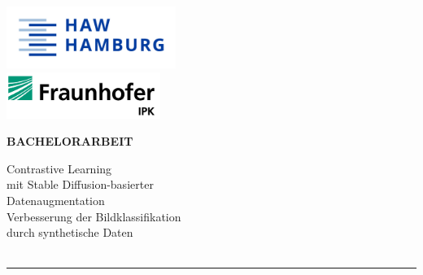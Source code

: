 \begin{titlepage}
  \color{haw}
  \raggedright
  \hfill\includegraphics[width=5.5cm]{logo_haw.jpg}\\
  \vspace{0.5cm}
  \hspace{\fill}\advance{}\includegraphics[width=5.0cm]{logo_fraunhofer-ipk.png}\\

  \vspace{5cm}

  \setmainfont{Open Sans}
  \small
  \textbf{BACHELORARBEIT}

  \vspace{8mm}

  \begin{minipage}{0.8\linewidth}
    \setmainfont{Martel Heavy}
    \LARGE
    Contrastive Learning\\[1mm] %
    mit Stable Diffusion-basierter\\[1mm]
    Datenaugmentation\\[4mm]
    \setmainfont{Open Sans}
    \Large
    Verbesserung der Bildklassifikation\\[1mm]
    durch synthetische Daten\\[1mm]
    \,\rule{11mm}{1.2mm}
  \end{minipage}

  \vspace{9.2mm}


\end{titlepage}
